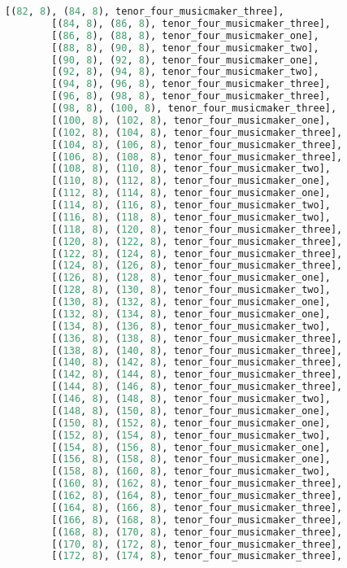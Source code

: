 \begin{lstlisting}[language=Python, caption=Invocation Source Code]
        [(82, 8), (84, 8), tenor_four_musicmaker_three],
        [(84, 8), (86, 8), tenor_four_musicmaker_three],
        [(86, 8), (88, 8), tenor_four_musicmaker_one],
        [(88, 8), (90, 8), tenor_four_musicmaker_two],
        [(90, 8), (92, 8), tenor_four_musicmaker_one],
        [(92, 8), (94, 8), tenor_four_musicmaker_two],
        [(94, 8), (96, 8), tenor_four_musicmaker_three],
        [(96, 8), (98, 8), tenor_four_musicmaker_three],
        [(98, 8), (100, 8), tenor_four_musicmaker_three],
        [(100, 8), (102, 8), tenor_four_musicmaker_one],
        [(102, 8), (104, 8), tenor_four_musicmaker_three],
        [(104, 8), (106, 8), tenor_four_musicmaker_three],
        [(106, 8), (108, 8), tenor_four_musicmaker_three],
        [(108, 8), (110, 8), tenor_four_musicmaker_two],
        [(110, 8), (112, 8), tenor_four_musicmaker_one],
        [(112, 8), (114, 8), tenor_four_musicmaker_one],
        [(114, 8), (116, 8), tenor_four_musicmaker_two],
        [(116, 8), (118, 8), tenor_four_musicmaker_two],
        [(118, 8), (120, 8), tenor_four_musicmaker_three],
        [(120, 8), (122, 8), tenor_four_musicmaker_three],
        [(122, 8), (124, 8), tenor_four_musicmaker_three],
        [(124, 8), (126, 8), tenor_four_musicmaker_three],
        [(126, 8), (128, 8), tenor_four_musicmaker_one],
        [(128, 8), (130, 8), tenor_four_musicmaker_two],
        [(130, 8), (132, 8), tenor_four_musicmaker_one],
        [(132, 8), (134, 8), tenor_four_musicmaker_one],
        [(134, 8), (136, 8), tenor_four_musicmaker_two],
        [(136, 8), (138, 8), tenor_four_musicmaker_three],
        [(138, 8), (140, 8), tenor_four_musicmaker_three],
        [(140, 8), (142, 8), tenor_four_musicmaker_three],
        [(142, 8), (144, 8), tenor_four_musicmaker_three],
        [(144, 8), (146, 8), tenor_four_musicmaker_three],
        [(146, 8), (148, 8), tenor_four_musicmaker_two],
        [(148, 8), (150, 8), tenor_four_musicmaker_one],
        [(150, 8), (152, 8), tenor_four_musicmaker_one],
        [(152, 8), (154, 8), tenor_four_musicmaker_two],
        [(154, 8), (156, 8), tenor_four_musicmaker_one],
        [(156, 8), (158, 8), tenor_four_musicmaker_one],
        [(158, 8), (160, 8), tenor_four_musicmaker_two],
        [(160, 8), (162, 8), tenor_four_musicmaker_three],
        [(162, 8), (164, 8), tenor_four_musicmaker_three],
        [(164, 8), (166, 8), tenor_four_musicmaker_three],
        [(166, 8), (168, 8), tenor_four_musicmaker_three],
        [(168, 8), (170, 8), tenor_four_musicmaker_three],
        [(170, 8), (172, 8), tenor_four_musicmaker_three],
        [(172, 8), (174, 8), tenor_four_musicmaker_three],

\end{lstlisting}
